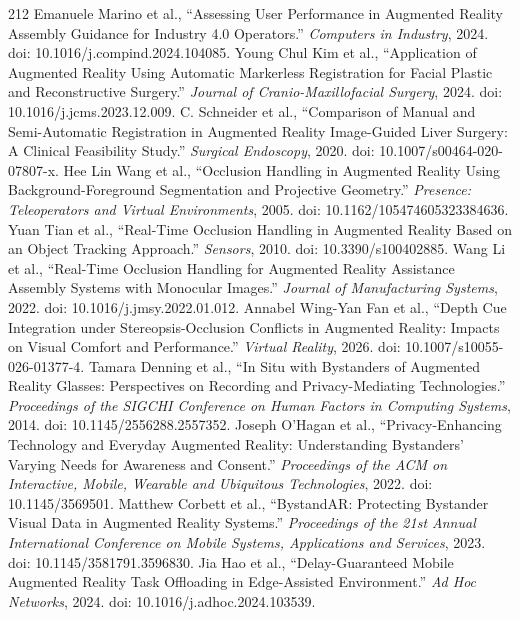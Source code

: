 \begin{thebibliography}{212}
 Emanuele Marino et al., ``Assessing User Performance in Augmented Reality Assembly Guidance for Industry 4.0 Operators.'' \emph{Computers in Industry}, 2024. doi: 10.1016/j.compind.2024.104085.
 Young Chul Kim et al., ``Application of Augmented Reality Using Automatic Markerless Registration for Facial Plastic and Reconstructive Surgery.'' \emph{Journal of Cranio-Maxillofacial Surgery}, 2024. doi: 10.1016/j.jcms.2023.12.009.
 C. Schneider et al., ``Comparison of Manual and Semi-Automatic Registration in Augmented Reality Image-Guided Liver Surgery: A Clinical Feasibility Study.'' \emph{Surgical Endoscopy}, 2020. doi: 10.1007/s00464-020-07807-x.
 Hee Lin Wang et al., ``Occlusion Handling in Augmented Reality Using Background-Foreground Segmentation and Projective Geometry.'' \emph{Presence: Teleoperators and Virtual Environments}, 2005. doi: 10.1162/105474605323384636.
 Yuan Tian et al., ``Real-Time Occlusion Handling in Augmented Reality Based on an Object Tracking Approach.'' \emph{Sensors}, 2010. doi: 10.3390/s100402885.
 Wang Li et al., ``Real-Time Occlusion Handling for Augmented Reality Assistance Assembly Systems with Monocular Images.'' \emph{Journal of Manufacturing Systems}, 2022. doi: 10.1016/j.jmsy.2022.01.012.
 Annabel Wing-Yan Fan et al., ``Depth Cue Integration under Stereopsis-Occlusion Conflicts in Augmented Reality: Impacts on Visual Comfort and Performance.'' \emph{Virtual Reality}, 2026. doi: 10.1007/s10055-026-01377-4.
 Tamara Denning et al., ``In Situ with Bystanders of Augmented Reality Glasses: Perspectives on Recording and Privacy-Mediating Technologies.'' \emph{Proceedings of the SIGCHI Conference on Human Factors in Computing Systems}, 2014. doi: 10.1145/2556288.2557352.
 Joseph O'Hagan et al., ``Privacy-Enhancing Technology and Everyday Augmented Reality: Understanding Bystanders' Varying Needs for Awareness and Consent.'' \emph{Proceedings of the ACM on Interactive, Mobile, Wearable and Ubiquitous Technologies}, 2022. doi: 10.1145/3569501.
 Matthew Corbett et al., ``{BystandAR}: Protecting Bystander Visual Data in Augmented Reality Systems.'' \emph{Proceedings of the 21st Annual International Conference on Mobile Systems, Applications and Services}, 2023. doi: 10.1145/3581791.3596830.
 Jia Hao et al., ``Delay-Guaranteed Mobile Augmented Reality Task Offloading in Edge-Assisted Environment.'' \emph{Ad Hoc Networks}, 2024. doi: 10.1016/j.adhoc.2024.103539.

\end{thebibliography}
